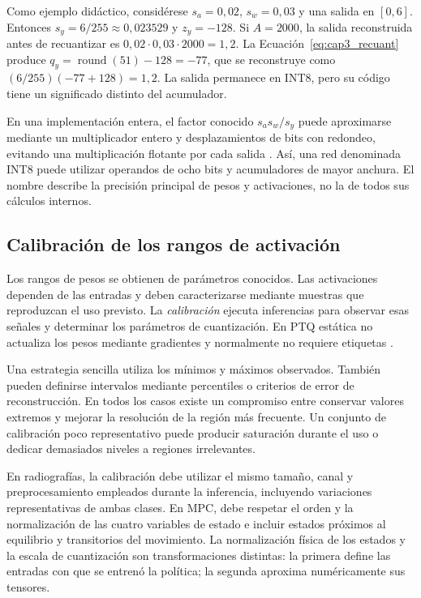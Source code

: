 Como ejemplo didáctico, considérese $s_a=0{,}02$, $s_w=0{,}03$ y una salida en $[0,6]$. Entonces $s_y=6/255\approx0{,}023529$ y $z_y=-128$. Si $A=2000$, la salida reconstruida antes de recuantizar es $0{,}02\cdot0{,}03\cdot2000=1{,}2$. La Ecuación~\ref{eq:cap3_recuant} produce $q_y=\operatorname{round}(51)-128=-77$, que se reconstruye como $(6/255)(-77+128)=1{,}2$. La salida permanece en INT8, pero su código tiene un significado distinto del acumulador.

En una implementación entera, el factor conocido $s_as_w/s_y$ puede aproximarse mediante un multiplicador entero y desplazamientos de bits con redondeo, evitando una multiplicación flotante por cada salida \cite{jacob2018}. Así, una red denominada INT8 puede utilizar operandos de ocho bits y acumuladores de mayor anchura. El nombre describe la precisión principal de pesos y activaciones, no la de todos sus cálculos internos.

\subsection{Calibración de los rangos de activación}
Los rangos de pesos se obtienen de parámetros conocidos. Las activaciones dependen de las entradas y deben caracterizarse mediante muestras que reproduzcan el uso previsto. La \emph{calibración} ejecuta inferencias para observar esas señales y determinar los parámetros de cuantización. En PTQ estática no actualiza los pesos mediante gradientes y normalmente no requiere etiquetas \cite{litertptq}.

Una estrategia sencilla utiliza los mínimos y máximos observados. También pueden definirse intervalos mediante percentiles o criterios de error de reconstrucción. En todos los casos existe un compromiso entre conservar valores extremos y mejorar la resolución de la región más frecuente. Un conjunto de calibración poco representativo puede producir saturación durante el uso o dedicar demasiados niveles a regiones irrelevantes.

En radiografías, la calibración debe utilizar el mismo tamaño, canal y preprocesamiento empleados durante la inferencia, incluyendo variaciones representativas de ambas clases. En MPC, debe respetar el orden y la normalización de las cuatro variables de estado e incluir estados próximos al equilibrio y transitorios del movimiento. La normalización física de los estados y la escala de cuantización son transformaciones distintas: la primera define las entradas con que se entrenó la política; la segunda aproxima numéricamente sus tensores.


